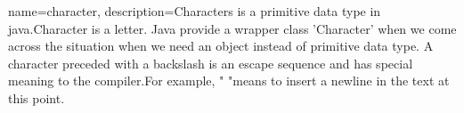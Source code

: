 {
    name=character,
    description={Characters is a primitive data type in java.Character is a letter. Java provide a wrapper class 'Character' when we come across the situation when we need an object instead of primitive data type. A character preceded with a backslash is an escape sequence and has special meaning to the compiler.For example, " \n "means to insert a newline in the text at this point.}
}
 

